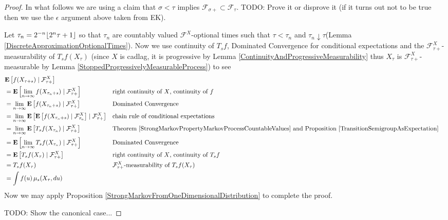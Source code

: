 \begin{proof}
In what follows we are using a claim that $\sigma < \tau$ implies $\mathcal{F}_{\sigma+} \subset \mathcal{F}_\tau$.  TODO: Prove it or disprove it (if it turns out not to be true then we use the $\epsilon$ argument above taken from EK).

Let  $\tau_n = 2^{-n}\floor{2^n \tau + 1}$ so that $\tau_n$ are countably valued $\mathcal{F}^X$-optional times
such that  $\tau < \tau_n$  and $\tau_n \downarrow \tau$(Lemma \ref{DiscreteApproximationOptionalTimes}).  Now we use continuity of $T_sf$, Dominated Convergence for conditional expectations and the $\mathcal{F}^X_{\tau+}$-measurability of $T_s f (X_{\tau})$ (since $X$ is cadlag, it is progressive by Lemma \ref{ContinuityAndProgressiveMeasurability} thus $X_\tau$ is $\mathcal{F}^X_{\tau+}$-measurable by Lemma \ref{StoppedProgressivelyMeasurableProcess}) to see
\begin{align*}
&\cexpectationlong{\mathcal{F}^X_{\tau+}}{f(X_{\tau + s})} \\
&= \cexpectationlong{\mathcal{F}^X_{\tau+}}{\lim_{n \to \infty}  f(X_{\tau_n + s})} && \text{right continuity of $X$, continuity of $f$}\\
&= \lim_{n \to \infty}  \cexpectationlong{\mathcal{F}^X_{\tau+}}{f(X_{\tau_n + s})} && \text{Dominated Convergence}\\
&= \lim_{n \to \infty} \cexpectationlong{\mathcal{F}^X_{\tau+}}{\cexpectationlong{\mathcal{F}^X_{\tau_n}}{f(X_{\tau_n + s})}} && \text{chain rule of conditional expectations}\\
&=\lim_{n \to \infty} \cexpectationlong{\mathcal{F}^X_{\tau+}}{T_s f (X_{\tau_n})} &&  \text{Theorem \ref{StrongMarkovPropertyMarkovProcessCountableValues} and Proposition \ref{TransitionSemigroupAsExpectation}}\\
&=\cexpectationlong{\mathcal{F}^X_{\tau+}}{\lim_{n \to \infty} T_s f (X_{\tau_n})}  && \text{Dominated Convergence}\\
&=\cexpectationlong{\mathcal{F}^X_{\tau+}}{T_s f (X_{\tau})} && \text{right continuity of $X$, continuity of $T_sf$}\\
&=T_s f (X_{\tau}) && \text{$\mathcal{F}^X_{\tau+}$-measurability of $T_s f (X_{\tau})$}\\
&=\int f(u) \, \mu_s (X_{\tau}, du) \\
\end{align*}
Now we may apply Proposition \ref{StrongMarkovFromOneDimensionalDistribution} to complete the proof.

TODO: Show the canonical case...
\end{proof}

